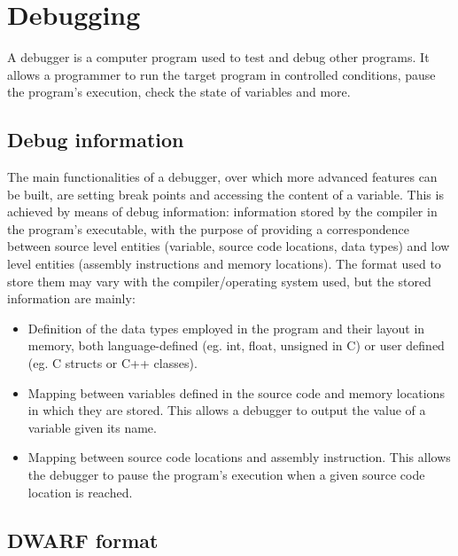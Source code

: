 \section{Debugging}
A debugger is a computer program used to test and debug other programs. It allows a programmer to run the target program in controlled conditions, pause the program's execution, check the state of variables and more.

\subsection{Debug information}
The main functionalities of a debugger, over which more advanced features can be built, are setting break points and accessing the content of a variable. \newline 
This is achieved by means of debug information: information stored by the compiler in the program's executable, with the purpose of providing a correspondence between source level entities (variable, source code locations, data types) and low level entities (assembly instructions and memory locations). \newline
The format used to store them may vary with the compiler/operating system used, but the stored information are mainly:
\begin{itemize}
\item Definition of the data types employed in the program and their layout in memory, both language-defined (eg. int, float, unsigned in C) or user defined (eg. C structs or C++ classes). 
\item Mapping between variables defined in the source code and memory locations in which they are stored. This allows a debugger to output the value of a variable given its name.
\item Mapping between source code locations and assembly instruction. This allows the debugger to pause the program's execution when a given source code location is reached.
\end{itemize}

\subsection{DWARF format}

